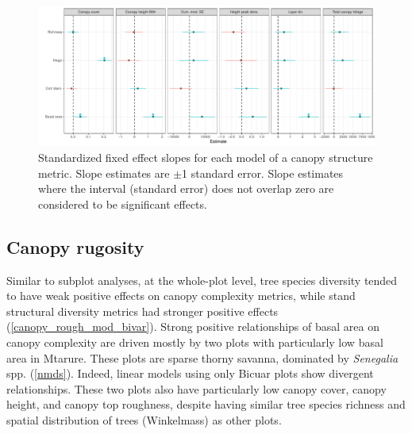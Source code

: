 \documentclass[11pt,a4paper]{article}
\begin{document}
\begin{figure}[H]
\centering
	\includegraphics[width=\textwidth]{height_profile_mod_rich_slopes}
	\caption{Standardized fixed effect slopes for each model of a canopy structure metric. Slope estimates are $\pm$1 standard error. Slope estimates where the interval (standard error) does not overlap zero are considered to be significant effects.}
	\label{height_profile_mod_rich_slopes}
\end{figure}

\subsection{Canopy rugosity}

Similar to subplot analyses, at the whole-plot level, tree species diversity tended to have weak positive effects on canopy complexity metrics, while stand structural diversity metrics had stronger positive effects (\autoref{canopy_rough_mod_bivar}). Strong positive relationships of basal area on canopy complexity are driven mostly by two plots with particularly low basal area in Mtarure. These plots are sparse thorny savanna, dominated by \textit{Senegalia} spp. (\autoref{nmds}). Indeed, linear models using only Bicuar plots show divergent relationships. These two plots also have particularly low canopy cover, canopy height, and canopy top roughness, despite having similar tree species richness and spatial distribution of trees (Winkelmass) as other plots.
\end{document}

